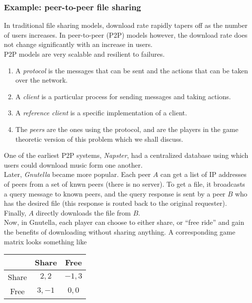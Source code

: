 	\subsubsection{Example: peer-to-peer file sharing}

		In traditional file sharing models, download rate rapidly tapers off as the number of users increases. In peer-to-peer (P2P) models however, the download rate does not change significantly with an increase in users.\\
		P2P models are very scalable and resilient to failures.
		\begin{enumerate}
			\item A \emph{protocol} is the messages that can be sent and the actions that can be taken over the network.
			\item A \emph{client} is a particular process for sending messages and taking actions.
			\item A \emph{reference client} is a specific implementation of a client.
			\item The \emph{peers} are the ones using the protocol, and are the players in the game theoretic version of this problem which we shall discuss.
		\end{enumerate}

		One of the earliest P2P systems, \emph{Napster}, had a centralized database using which users could download music form one another.\\
		Later, \emph{Gnutella} became more popular. Each peer $A$ can get a list of IP addresses of peers from a set of knwn peers (there is no server). To get a file, it broadcasts a query message to known peers, and the query response is sent by a peer $B$ who has the desired file (this response is routed back to the original requester). Finally, $A$ directly downloads the file from $B$.\\

		Now, in Gnutella, each player can choose to either share, or ``free ride'' and gain the benefits of downloading without sharing anything. A corresponding game matrix looks something like
		\begin{center}
		\begin{tabular}{|c||c|c|}
			\hline
			& \textsf{Share} & \textsf{Free} \\
			\hline\hline
			\textsf{Share} & $2,2$ & $-1,3$ \\
			\hline
			\textsf{Free} & $3,-1$ & $0,0$ \\
			\hline 
		\end{tabular}
		\end{center}

